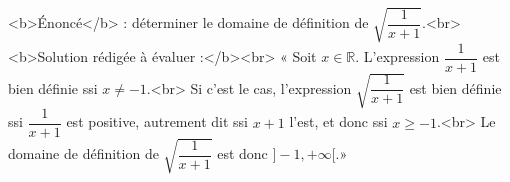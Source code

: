 <b>Énoncé</b> : déterminer le domaine de définition de $\sqrt{\dfrac{1}{x+1}}$.<br> <b>Solution rédigée à évaluer :</b><br>  « Soit $x\in\mathbb{R}$. L'expression $\dfrac{1}{x+1}$ est bien définie ssi $x\neq -1$.<br> Si c'est le cas, l'expression $\sqrt{\dfrac{1}{x+1}}$ est bien définie ssi $\dfrac{1}{x+1}$ est positive, autrement dit ssi $x+1$ l'est, et donc ssi $x\geq -1$.<br> Le domaine de définition de $\sqrt{\dfrac{1}{x+1}}$ est donc $]-1,+\infty[$.»

\begin{reponses}
\end{reponses}

